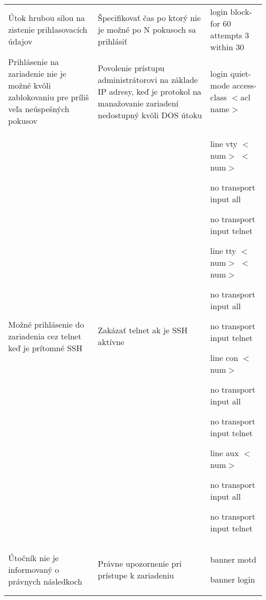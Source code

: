 \begin{longtable}[!htbp]{|L{10em}L{10em}L{34em}|}
	
	
	
	Útok hrubou silou na zistenie prihlasovacích údajov	&Špecifikovať čas po ktorý nie je možné po N pokusoch sa prihlásiť	&login block-for 60 attempts 3 within 30\\
	
	
	
	
	 Prihlásenie na zariadenie nie je možné kvôli zablokovaniu pre príliš veľa neúspešných pokusov	&Povolenie prístupu administrátorovi na základe IP adresy, keď je protokol na manažovanie zariadení nedostupný kvôli DOS útoku	&login quiet-mode access-class $<$acl name$>$\\
	
	
	
	Možné prihlásenie do zariadenia cez telnet keď je prítomné SSH	&Zakázať telnet ak je SSH aktívne	&line vty $<$num$>$ $<$num$>$
	
	\hspace{0.5em}no transport input all
	
	\hspace{0.5em}no transport input telnet
	\vspace{0.5em}
	
	line tty $<$num$>$ $<$num$>$
	
	\hspace{0.5em}no transport input all
	
	\hspace{0.5em}no transport input telnet
	\vspace{0.5em}
	
	line con $<$num$>$
	
	\hspace{0.5em}no transport input all
	
	\hspace{0.5em}no transport input telnet
	\vspace{0.5em}
	
	line aux $<$num$>$
	
	\hspace{0.5em}no transport input all
	
	\hspace{0.5em}no transport input telnet\\
	
	
	
	
	 Útočník nie je informovaný o právnych následkoch	&Právne upozornenie pri prístupe k zariadeniu	&banner motd
	
	banner login
	

\end{longtable}
